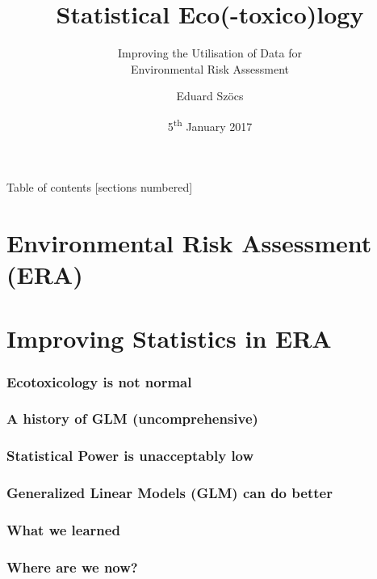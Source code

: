 \documentclass[10pt
]{beamer}
\title{Statistical Eco(-toxico)logy}
\subtitle{Improving the Utilisation of Data for\\Environmental Risk Assessment}
\date{5\textsuperscript{th} January 2017}
\author{Eduard Sz\"{o}cs}
\begin{document}
\maketitle

\begin{frame}{Table of contents}
  [sections numbered]
  \tableofcontents[hideallsubsections]
\end{frame}

\section{Environmental Risk Assessment (ERA)}


\section{Improving Statistics in ERA}

\begin{frame}
\frametitle{Ecotoxicology is not normal}

\end{frame}



\begin{frame}
\frametitle{A history of GLM (uncomprehensive)}

\end{frame}


\begin{frame}
\frametitle{Statistical Power is unacceptably low}

\end{frame}


\begin{frame}
\frametitle{Generalized Linear Models (GLM) can do better}

\end{frame}



\begin{frame}
\frametitle{What we learned}

\end{frame}


\begin{frame}
\frametitle{Where are we now?}

\end{frame}
\end{document}
